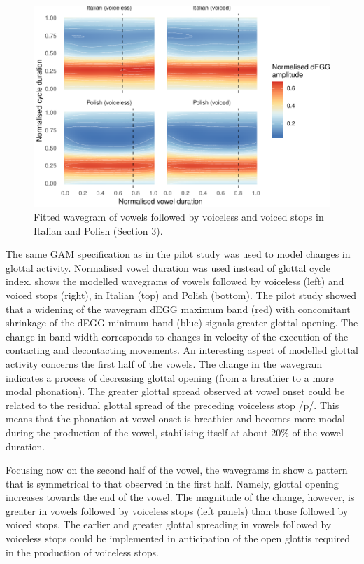 \documentclass[
  11pt,
  a4paper,
]{article}
\begin{document}
\begin{figure}
\includegraphics[width=\linewidth]{2019-wavegram_files/figure-latex/surface-1} \caption{Fitted wavegram of vowels followed by voiceless and voiced stops in Italian and Polish (Section 3).}\label{f:surface}
\end{figure}

The same GAM specification as in the pilot study was used to model
changes in glottal activity. Normalised vowel duration was used instead
of glottal cycle index.  shows the modelled wavegrams of
vowels followed by voiceless (left) and voiced stops (right), in Italian
(top) and Polish (bottom). The pilot study showed that a widening of the
wavegram dEGG maximum band (red) with concomitant shrinkage of the dEGG
minimum band (blue) signals greater glottal opening. The change in band
width corresponds to changes in velocity of the execution of the
contacting and decontacting movements. An interesting aspect of modelled
glottal activity concerns the first half of the vowels. The change in
the wavegram indicates a process of decreasing glottal opening (from a
breathier to a more modal phonation). The greater glottal spread
observed at vowel onset could be related to the residual glottal spread
of the preceding voiceless stop /p/. This means that the phonation at
vowel onset is breathier and becomes more modal during the production of
the vowel, stabilising itself at about 20\% of the vowel duration.

Focusing now on the second half of the vowel, the wavegrams in
 show a pattern that is symmetrical to that observed in
the first half. Namely, glottal opening increases towards the end of the
vowel. The magnitude of the change, however, is greater in vowels
followed by voiceless stops (left panels) than those followed by voiced
stops. The earlier and greater glottal spreading in vowels followed by
voiceless stops could be implemented in anticipation of the open glottis
required in the production of voiceless stops.
\end{document}
